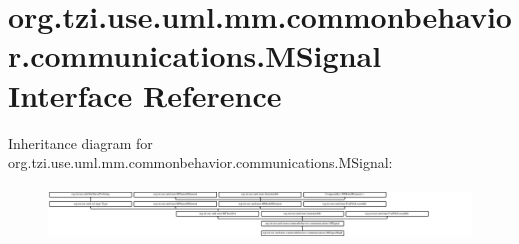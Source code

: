 \hypertarget{interfaceorg_1_1tzi_1_1use_1_1uml_1_1mm_1_1commonbehavior_1_1communications_1_1_m_signal}{\section{org.\-tzi.\-use.\-uml.\-mm.\-commonbehavior.\-communications.\-M\-Signal Interface Reference}
\label{interfaceorg_1_1tzi_1_1use_1_1uml_1_1mm_1_1commonbehavior_1_1communications_1_1_m_signal}
}
Inheritance diagram for org.\-tzi.\-use.\-uml.\-mm.\-commonbehavior.\-communications.\-M\-Signal\-:\begin{figure}[H]
\begin{center}
\leavevmode
\includegraphics[height=1.439589cm]{interfaceorg_1_1tzi_1_1use_1_1uml_1_1mm_1_1commonbehavior_1_1communications_1_1_m_signal}
\end{center}
\end{figure}
